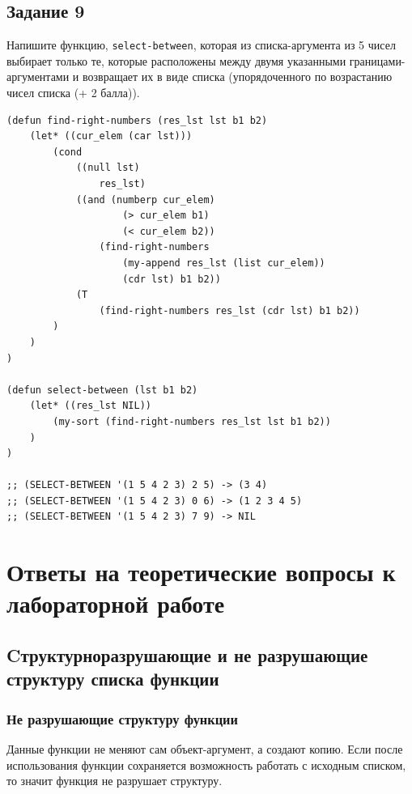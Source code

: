 \documentclass[a4paper,14pt, unknownkeysallowed]{extreport}
\begin{document}
\clearpage

\section{Задание 9}

Напишите функцию, \texttt{select-between}, которая из списка-аргумента из 5 чисел выбирает только те, которые расположены между двумя указанными границами-аргументами и возвращает их в виде списка (упорядоченного по возрастанию чисел списка (+ 2 балла)).

\begin{center}
\captionsetup{justification=raggedright,singlelinecheck=off}
\begin{lstlisting}[label=lst:parallel_processing,caption=Решение задания 9]
(defun find-right-numbers (res_lst lst b1 b2)
    (let* ((cur_elem (car lst)))
        (cond
            ((null lst)
                res_lst)
            ((and (numberp cur_elem) 
                    (> cur_elem b1)
                    (< cur_elem b2))
                (find-right-numbers 
                    (my-append res_lst (list cur_elem))
                    (cdr lst) b1 b2))
            (T 
                (find-right-numbers res_lst (cdr lst) b1 b2))
        )
    )
)

(defun select-between (lst b1 b2)
    (let* ((res_lst NIL))
        (my-sort (find-right-numbers res_lst lst b1 b2))
    )
)

;; (SELECT-BETWEEN '(1 5 4 2 3) 2 5) -> (3 4)
;; (SELECT-BETWEEN '(1 5 4 2 3) 0 6) -> (1 2 3 4 5)
;; (SELECT-BETWEEN '(1 5 4 2 3) 7 9) -> NIL
\end{lstlisting}
\end{center}


\chapter{Ответы на теоретические вопросы к лабораторной работе}

\section{Cтруктурноразрушающие и не разрушающие структуру списка функции}

\subsection{Не разрушающие структуру функции}

Данные функции не меняют сам объект-аргумент, а создают копию. Если после использования функции сохраняется возможность работать с исходным списком, то значит функция не разрушает структуру.
\end{document}
